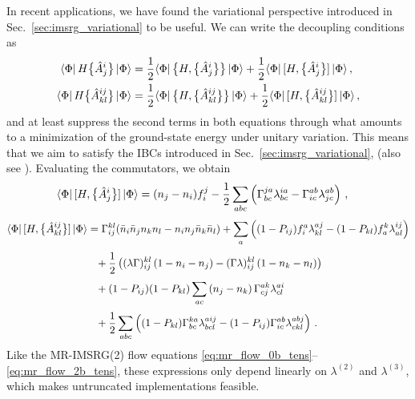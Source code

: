 In recent applications, we have found the variational perspective
introduced in Sec.~\ref{sec:imsrg_variational} to be useful. We
can write the decoupling conditions as
\begin{align}
  \langle{\Phi}|\,{H\big\{\hat{A}^{i}_{j}\big\}}\,|{\Phi}\rangle 
    &= \frac{1}{2}\langle{\Phi}|\,{ \big\{ {H}, {\big\{\hat{A}^{i}_{j}\big\}} \big\} }\,|{\Phi}\rangle 
    + \frac{1}{2}\langle{\Phi}|\,{[{H},{\big\{\hat{A}^{i}_{j}\big\}}]}\,|{\Phi}\rangle\,,\\
  \langle{\Phi}|\,{H\big\{\hat{A}^{ij}_{kl}\big\}}\,|{\Phi}\rangle 
    &= \frac{1}{2}\langle{\Phi}|\,{ \big\{ {H}, {\big\{\hat{A}^{ij}_{kl}\big\}} \big\} }\,|{\Phi}\rangle 
    + \frac{1}{2}\langle{\Phi}|\,{[{H},{\big\{\hat{A}^{ij}_{kl}\big\}}]}\,|{\Phi}\rangle\,,
\end{align}
and at least suppress the second terms in both equations through what 
amounts to a minimization of the ground-state energy under unitary variation. 
This means that we aim to satisfy the IBCs introduced in Sec.~\ref{sec:imsrg_variational}, 
(also see \cite{Mukherjee:2001uq,Kutzelnigg:2002kx,Kutzelnigg:2004vn,Kutzelnigg:2004ys}).
Evaluating the commutators, we obtain
\begin{align}
  \langle{\Phi}|\,{[{H},{\big\{\hat{A}^{i}_{j}\big\}}]}\,|{\Phi}\rangle
    &=(n_j-n_i)f^{j}_{i}-\frac{1}{2}\sum_{abc}\left(  
     \Gamma^{ja}_{bc}\lambda^{ia}_{bc}
    -\Gamma^{ab}_{ic}\lambda^{ab}_{jc}
    \right)\,,
\end{align}
% 
\begin{align}
  \dmatrixe{\Phi}{\comm{H}{\nord{\AO^{ij}_{kl}}}}%
  &=
    \Gamma^{kl}_{ij}(\nn_i\nn_jn_kn_l - n_in_j\nn_k\nn_l)
  +\sum_{a}
     \left(
     (1-P_{ij})f^{a}_{i}\lambda^{aj}_{kl}
    -(1-P_{kl})f^{k}_{a}\lambda^{ij}_{al}
    \right)
    \notag\\[3pt]
% 
  &\hphantom{=}
    +\frac{1}{2}\left(
      (\lambda\Gamma)^{kl}_{ij}\left(1-n_i-n_j\right)
      -(\Gamma\lambda)^{kl}_{ij}\left(1-n_k-n_l\right)
    \right)
  \notag\\[3pt]
%
  &\hphantom{=}
    +(1-P_{ij})(1-P_{kl})\sum_{ac}
       \left(n_j-n_k\right)\Gamma^{ak}_{cj}\lambda^{ai}_{cl}
    \notag\\[3pt]
% 
  &\hphantom{=}
    +\frac{1}{2}\sum_{abc}\left(
       (1-P_{kl})\Gamma^{ka}_{bc}\lambda^{aij}_{bcl} 
      -(1-P_{ij})\Gamma^{ab}_{ic}\lambda^{abj}_{ckl} 
    \right)\,.
%   
\end{align}
Like the MR-IMSRG(2) flow equations \eqref{eq:mr_flow_0b_tens}--\eqref{eq:mr_flow_2b_tens},
these expressions only depend linearly on $\lambda^{(2)}$ and $\lambda^{(3)}$,
which makes untruncated implementations feasible.

